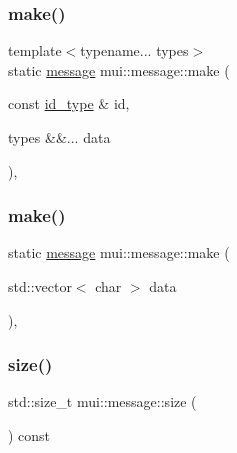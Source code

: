 \mbox{\label{structmui_1_1message_ab75db40598b84930d88eadcefa3ae94f}} 
\subsubsection{\texorpdfstring{make()}{make()}\hspace{0.1cm}{\footnotesize\ttfamily [1/2]}}
{\footnotesize\ttfamily template$<$typename... types$>$ \\
static \hyperlink{structmui_1_1message}{message} mui\+::message\+::make (\begin{DoxyParamCaption}\item[{const \hyperlink{structmui_1_1message_aecbd0ac37983ce799121a1d78d97a9c1}{id\+\_\+type} \&}]{id,  }\item[{types \&\&...}]{data }\end{DoxyParamCaption})\hspace{0.3cm}{\ttfamily [inline]}, {\ttfamily [static]}}

\mbox{\label{structmui_1_1message_a2d47197a74abcedc0c035d5190084050}} 
\subsubsection{\texorpdfstring{make()}{make()}\hspace{0.1cm}{\footnotesize\ttfamily [2/2]}}
{\footnotesize\ttfamily static \hyperlink{structmui_1_1message}{message} mui\+::message\+::make (\begin{DoxyParamCaption}\item[{std\+::vector$<$ char $>$}]{data }\end{DoxyParamCaption})\hspace{0.3cm}{\ttfamily [inline]}, {\ttfamily [static]}}

\mbox{\label{structmui_1_1message_a5cf6b0eeddeea86664e9a2f17f41a872}} 
\subsubsection{\texorpdfstring{size()}{size()}}
{\footnotesize\ttfamily std\+::size\+\_\+t mui\+::message\+::size (\begin{DoxyParamCaption}{ }\end{DoxyParamCaption}) const\hspace{0.3cm}{\ttfamily [inline]}}



